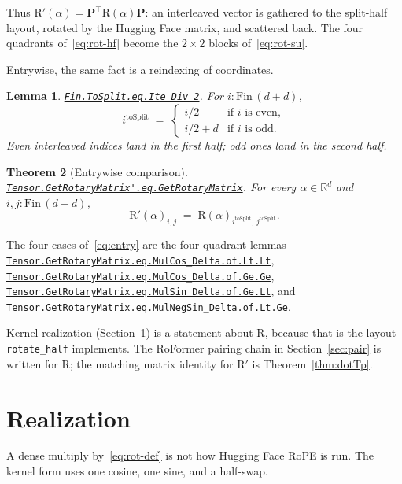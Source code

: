 \documentclass[11pt,a4paper]{article}
\newcommand{\lmod}[1]{\href{http://www.lemma.cn/lean/?module=#1}{\nolinkurl{#1}}}
\newtheorem{theorem}{Theorem}[section]
\newtheorem{lemma}[theorem]{Lemma}
\newcommand{\R}{\mathbb{R}}
\newcommand{\rot}{\mathrm{R}}
\begin{document}
Thus \(\rot'(\alpha)=\boldsymbol{P}^\top\rot(\alpha)\boldsymbol{P}\): an interleaved vector is gathered to the split-half layout, rotated by the Hugging Face matrix, and scattered back.
The four quadrants of~\eqref{eq:rot-hf} become the \(2\times 2\) blocks of~\eqref{eq:rot-su}.

Entrywise, the same fact is a reindexing of coordinates.

\begin{lemma}
\label{lem:toSplit}
\lmod{Fin.ToSplit.eq.Ite_Div_2}.
For \(i:\mathrm{Fin}\,(d+d)\),
\begin{equation}
  i^{\mathrm{toSplit}}
  \;=\;
  \begin{cases}
    i/2 & \text{if \(i\) is even},\\
    i/2+d & \text{if \(i\) is odd}.
  \end{cases}
\end{equation}
Even interleaved indices land in the first half; odd ones land in the second half.
\end{lemma}

\begin{theorem}[Entrywise comparison]
\label{thm:entry}
\lmod{Tensor.GetRotaryMatrix'.eq.GetRotaryMatrix}.
For every \(\alpha\in\R^d\) and \(i,j:\mathrm{Fin}\,(d+d)\),
\begin{equation}
  \label{eq:entry}
  \rot'(\alpha)_{i,j}
  \;=\;
  \rot(\alpha)_{i^{\mathrm{toSplit}},\,j^{\mathrm{toSplit}}}.
\end{equation}
\end{theorem}

The four cases of~\eqref{eq:entry} are the four quadrant lemmas
\lmod{Tensor.GetRotaryMatrix.eq.MulCos_Delta.of.Lt.Lt},
\lmod{Tensor.GetRotaryMatrix.eq.MulCos_Delta.of.Ge.Ge},
\lmod{Tensor.GetRotaryMatrix.eq.MulSin_Delta.of.Ge.Lt},
and
\lmod{Tensor.GetRotaryMatrix.eq.MulNegSin_Delta.of.Lt.Ge}.

Kernel realization (Section~\ref{sec:real}) is a statement about \(\rot\), because that is the layout \texttt{rotate\_half} implements.
The RoFormer pairing chain in Section~\ref{sec:pair} is written for \(\rot\); the matching matrix identity for \(\rot'\) is Theorem~\ref{thm:dotTp}.

\section{Realization}
\label{sec:real}

A dense multiply by~\eqref{eq:rot-def} is not how Hugging Face RoPE is run.
The kernel form uses one cosine, one sine, and a half-swap.
\end{document}
